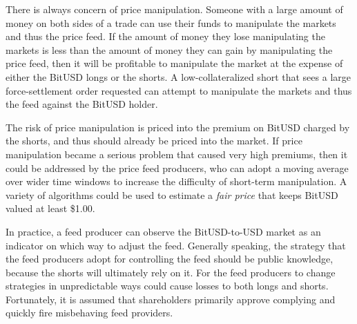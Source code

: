 There is always concern of price manipulation. Someone with a large amount of
money on both sides of a trade can use their funds to manipulate the markets
and thus the price feed. If the amount of money they lose manipulating the
markets is less than the amount of money they can gain by manipulating the
price feed, then it will be profitable to manipulate the market at the expense
of either the BitUSD longs or the shorts. A low-collateralized short that sees
a large force-settlement order requested can attempt to manipulate the markets
and thus the feed against the BitUSD holder.

The risk of price manipulation is priced into the premium on BitUSD charged by
the shorts, and thus should already be priced into the market. If price
manipulation became a serious problem that caused very high premiums, then it
could be addressed by the price feed producers, who can adopt a moving average
over wider time windows to increase the difficulty of short-term manipulation.
A variety of algorithms could be used to estimate a \emph{fair price} that
keeps BitUSD valued at least \$1.00.

In practice, a feed producer can observe the BitUSD-to-USD market as an
indicator on which way to adjust the feed. Generally speaking, the strategy
that the feed producers adopt for controlling the feed should be public
knowledge, because the shorts will ultimately rely on it. For the feed
producers to change strategies in unpredictable ways could cause losses to both
longs and shorts. Fortunately, it is assumed that shareholders primarily
approve complying and quickly fire misbehaving feed providers.
